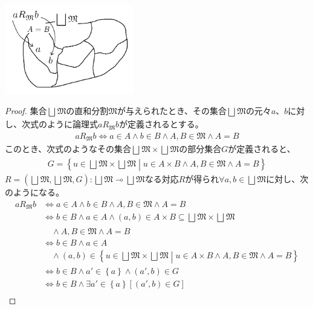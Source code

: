 \documentclass[dvipdfmx]{jsarticle}
\begin{document}
\begin{center}
  \includegraphics[width=160pt]{1.2.5.a.png}
\end{center}
\begin{proof}
集合$\bigsqcup_{} \mathfrak{M}$の直和分割$\mathfrak{M}$が与えられたとき、その集合$\bigsqcup_{} \mathfrak{M}$の元々$a$、$b$に対し、次式のように論理式$aR_{\mathfrak{M}}b$が定義されるとする。
\begin{align*}
aR_{\mathfrak{M}}b \Leftrightarrow a \in A \land b \in B \land A,B \in \mathfrak{M \land}A = B
\end{align*}
このとき、次式のようなその集合$\bigsqcup_{} \mathfrak{M} \times \bigsqcup_{} \mathfrak{M}$の部分集合$G$が定義されると、
\begin{align*}
G = \left\{ u \in \bigsqcup_{} \mathfrak{M} \times \bigsqcup_{} \mathfrak{M} \middle| u \in A \times B \land A,B \in \mathfrak{M \land}A = B \right\}
\end{align*}
$R = \left( \bigsqcup_{} \mathfrak{M},\bigsqcup_{} \mathfrak{M},G \right):\bigsqcup_{} \mathfrak{M} \multimap \bigsqcup_{} \mathfrak{M}$なる対応$R$が得られ$\forall a,b \in \bigsqcup_{} \mathfrak{M}$に対し、次のようになる。
\begin{align*}
aR_{\mathfrak{M}}b &\Leftrightarrow a \in A \land b \in B \land A,B \in \mathfrak{M \land}A = B\\
&\Leftrightarrow b \in B \land a \in A \land (a,b) \in A \times B \subseteq \bigsqcup_{} \mathfrak{M} \times \bigsqcup_{} \mathfrak{M} \\
&\quad \land A,B \in \mathfrak{M \land}A = B\\
&\Leftrightarrow b \in B \land a \in A \\
&\quad \land (a,b) \in \left\{ u \in \bigsqcup_{} \mathfrak{M} \times \bigsqcup_{} \mathfrak{M} \middle| u \in A \times B \land A,B \in \mathfrak{M} \land A = B \right\}\\
&\Leftrightarrow b \in B \land a' \in \left\{ a \right\} \land \left( a',b \right) \in G\\
&\Leftrightarrow b \in B \land \exists a' \in \left\{ a \right\}\left[ \left( a',b \right) \in G \right]\\

\end{align*}
\end{proof}
\end{document}
